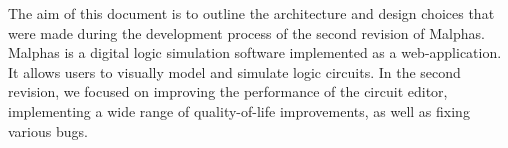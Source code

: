 The aim of this document is to outline the architecture and design choices that were made during the development process
of the second revision of Malphas.
Malphas is a digital logic simulation software implemented as a web-application. It allows users to visually model and simulate
logic circuits. In the second revision, we focused on improving the performance of the circuit editor, implementing a wide
range of quality-of-life improvements, as well as fixing various bugs.
